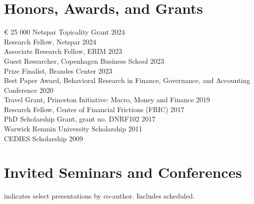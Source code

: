 \documentclass[11pt]{res} %
\newcommand{\fullhrulefill}{%
  \vspace{-1ex}%
  \hspace*{-\sectionwidth}\hrulefill%
  }
\begin{document}
\begin{resume}
\section{Honors, Awards, and Grants}
\fullhrulefill \newline
\euro{} 25 000 Netspar Topicality Grant  \hfill 2024\\
Research Fellow, Netspar \hfill 2024\\
Associate Research Fellow, ERIM  \hfill 2023\\
Guest Researcher, Copenhagen Business School \hfill 2023\\
Prize Finalist, Brandes Center \hfill 2023\\
Best Paper Award, Behavioral Research in Finance, Governance, and Accounting Conference \hfill 2020\\
Travel Grant, Princeton Initiative: Macro, Money and Finance \hfill 2019\\
Research Fellow, Center of Financial Frictions (FRIC)  \hfill 2017\\
PhD Scholarship Grant,  grant no. DNRF102 \hfill 2017\\
Warwick Renmin University Scholarship \hfill 2011\\
CEDIES Scholarship  \hfill 2009

\vspace{0.2in} %
\section{Invited Seminars and Conferences} 
\textnormal{\normalsize* indicates select presentations by co-author.  Includes scheduled.} 

\vspace{-3ex}
\fullhrulefill \newline
%
\begin{itemize}
\vspace{-2ex}


\end{itemize}
\end{resume}
\end{document}
